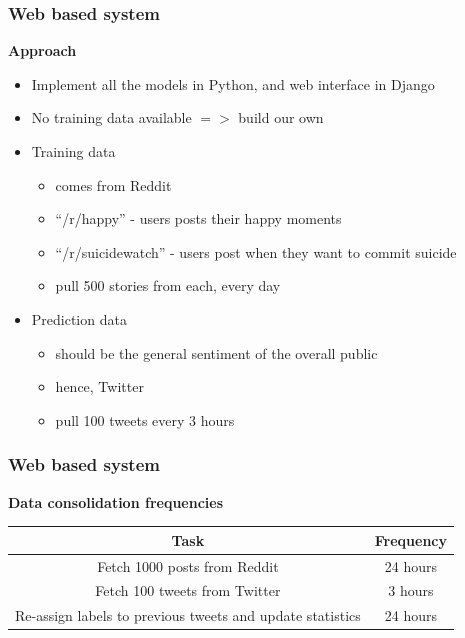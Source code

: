 \documentclass{beamer}
\begin{document}
    \begin{frame}
        \frametitle{Web based system}
        \begin{center}
            \textbf{Approach}
        \end{center}
        \begin{itemize}
            \item{Implement all the models in Python, and web interface in Django}
            \item{No training data available $=>$ build our own}
            \item{
            Training data
            \begin{itemize}
                \item{comes from Reddit}
                \item{``/r/happy'' - users posts their happy moments}
                \item{``/r/suicidewatch'' - users post when they want to commit suicide}
                \item{pull 500 stories from each, every day}
            \end{itemize}
            }
            \item{
            Prediction data
            \begin{itemize}
                \item{should be the general sentiment of the overall public}
                \item{hence, Twitter}
                \item{pull 100 tweets every 3 hours}
            \end{itemize}
            }
        \end{itemize}
    \end{frame}
    
    \begin{frame}
        \frametitle{Web based system}
        \begin{center}
            \textbf{Data consolidation frequencies}
        \end{center}
        \begin{table}
            \begin{center}
                \begin{tabular}{ | c | c | }
                    \hline
                    \textbf{Task} & \textbf{Frequency} \\
                    \hline
                    Fetch 1000 posts from Reddit & 24 hours \\
                    \hline
                    Fetch 100 tweets from Twitter & 3 hours \\
                    \hline
                    Re-assign labels to previous tweets and update statistics & 24 hours \\
                    \hline
                \end{tabular}
            \end{center}
        \end{table}
    \end{frame}
    
\end{document}
